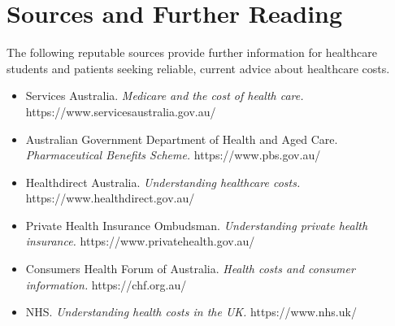 \section*{Sources and Further Reading}
The following reputable sources provide further information for healthcare students and patients seeking reliable, current advice about healthcare costs.

\begin{itemize}
    \item Services Australia. \textit{Medicare and the cost of health care.} https://www.servicesaustralia.gov.au/
    \item Australian Government Department of Health and Aged Care. \textit{Pharmaceutical Benefits Scheme.} https://www.pbs.gov.au/
    \item Healthdirect Australia. \textit{Understanding healthcare costs.} https://www.healthdirect.gov.au/
    \item Private Health Insurance Ombudsman. \textit{Understanding private health insurance.} https://www.privatehealth.gov.au/
    \item Consumers Health Forum of Australia. \textit{Health costs and consumer information.} https://chf.org.au/
    \item NHS. \textit{Understanding health costs in the UK.} https://www.nhs.uk/
\end{itemize}
